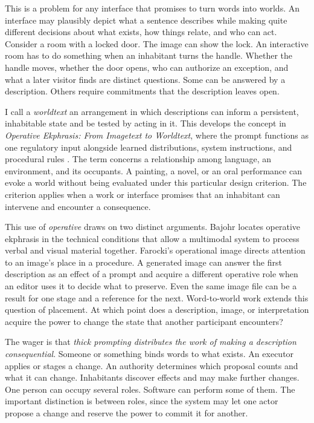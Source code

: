\documentclass[11pt,letterpaper]{article}
\newcommand{\work}[1]{\textit{#1}}
\begin{document}
This is a problem for any interface that promises to turn words into worlds. An interface may plausibly depict what a sentence describes while making quite different decisions about what exists, how things relate, and who can act. Consider a room with a locked door. The image can show the lock. An interactive room has to do something when an inhabitant turns the handle. Whether the handle moves, whether the door opens, who can authorize an exception, and what a later visitor finds are distinct questions. Some can be answered by a description. Others require commitments that the description leaves open.

I call a \emph{worldtext} an arrangement in which descriptions can inform a persistent, inhabitable state and be tested by acting in it. This develops the concept in \work{Operative Ekphrasis: From Imagetext to Worldtext}, where the prompt functions as one regulatory input alongside learned distributions, system instructions, and procedural rules \citep{BolterHartsoe}. The term concerns a relationship among language, an environment, and its occupants. A painting, a novel, or an oral performance can evoke a world without being evaluated under this particular design criterion. The criterion applies when a work or interface promises that an inhabitant can intervene and encounter a consequence.

This use of \emph{operative} draws on two distinct arguments. Bajohr locates operative ekphrasis in the technical conditions that allow a multimodal system to process verbal and visual material together. Farocki’s operational image directs attention to an image’s place in a procedure. A generated image can answer the first description as an effect of a prompt and acquire a different operative role when an editor uses it to decide what to preserve. Even the same image file can be a result for one stage and a reference for the next. Word-to-world work extends this question of placement. At which point does a description, image, or interpretation acquire the power to change the state that another participant encounters? \citep{Bajohr2024,Farocki2004,BolterHartsoe}

The wager is that \emph{thick prompting distributes the work of making a description consequential}. Someone or something binds words to what exists. An executor applies or stages a change. An authority determines which proposal counts and what it can change. Inhabitants discover effects and may make further changes. One person can occupy several roles. Software can perform some of them. The important distinction is between roles, since the system may let one actor propose a change and reserve the power to commit it for another.
\end{document}
